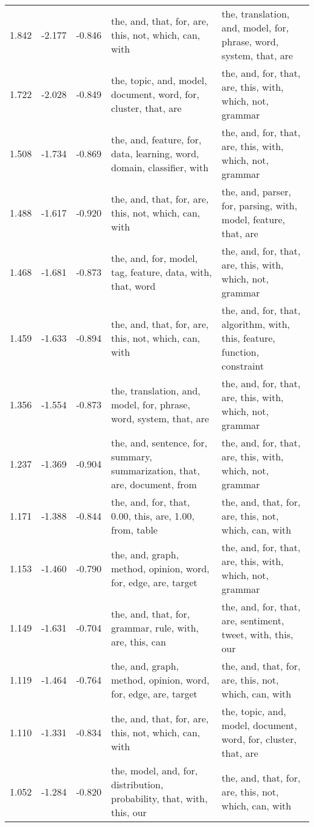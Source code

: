 \begin{tabular}{cccp{5cm}p{5cm}}
1.842 & -2.177 & -0.846 & the, and, that, for, are, this, not, which, can, with & the, translation, and, model, for, phrase, word, system, that, are \\
1.722 & -2.028 & -0.849 & the, topic, and, model, document, word, for, cluster, that, are & the, and, for, that, are, this, with, which, not, grammar \\
1.508 & -1.734 & -0.869 & the, and, feature, for, data, learning, word, domain, classifier, with & the, and, for, that, are, this, with, which, not, grammar \\
1.488 & -1.617 & -0.920 & the, and, that, for, are, this, not, which, can, with & the, and, parser, for, parsing, with, model, feature, that, are \\
1.468 & -1.681 & -0.873 & the, and, for, model, tag, feature, data, with, that, word & the, and, for, that, are, this, with, which, not, grammar \\
1.459 & -1.633 & -0.894 & the, and, that, for, are, this, not, which, can, with & the, and, for, that, algorithm, with, this, feature, function, constraint \\
1.356 & -1.554 & -0.873 & the, translation, and, model, for, phrase, word, system, that, are & the, and, for, that, are, this, with, which, not, grammar \\
1.237 & -1.369 & -0.904 & the, and, sentence, for, summary, summarization, that, are, document, from & the, and, for, that, are, this, with, which, not, grammar \\
1.171 & -1.388 & -0.844 & the, and, for, that, 0.00, this, are, 1.00, from, table & the, and, that, for, are, this, not, which, can, with \\
1.153 & -1.460 & -0.790 & the, and, graph, method, opinion, word, for, edge, are, target & the, and, for, that, are, this, with, which, not, grammar \\
1.149 & -1.631 & -0.704 & the, and, that, for, grammar, rule, with, are, this, can & the, and, for, that, are, sentiment, tweet, with, this, our \\
1.119 & -1.464 & -0.764 & the, and, graph, method, opinion, word, for, edge, are, target & the, and, that, for, are, this, not, which, can, with \\
1.110 & -1.331 & -0.834 & the, and, that, for, are, this, not, which, can, with & the, topic, and, model, document, word, for, cluster, that, are \\
1.052 & -1.284 & -0.820 & the, model, and, for, distribution, probability, that, with, this, our & the, and, that, for, are, this, not, which, can, with \\

\end{tabular}
